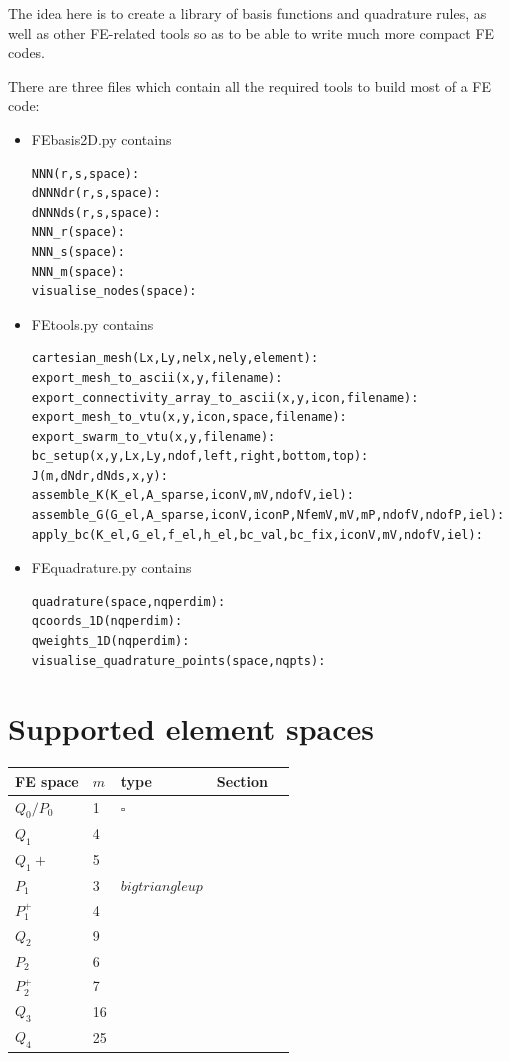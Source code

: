 
The idea here is to create a library of basis functions and quadrature rules, as well as 
other FE-related tools so as to be able to write much more compact FE codes. 

There are three files which contain all the required tools to build most of a FE code:

\begin{itemize}

\item {\pythonfile FEbasis2D.py} contains 
\begin{lstlisting}
NNN(r,s,space):
dNNNdr(r,s,space):
dNNNds(r,s,space):
NNN_r(space):
NNN_s(space):
NNN_m(space):
visualise_nodes(space):
\end{lstlisting}



\item {\pythonfile FEtools.py} contains

\begin{lstlisting}
cartesian_mesh(Lx,Ly,nelx,nely,element):
export_mesh_to_ascii(x,y,filename):
export_connectivity_array_to_ascii(x,y,icon,filename):
export_mesh_to_vtu(x,y,icon,space,filename):
export_swarm_to_vtu(x,y,filename):
bc_setup(x,y,Lx,Ly,ndof,left,right,bottom,top):
J(m,dNdr,dNds,x,y):
assemble_K(K_el,A_sparse,iconV,mV,ndofV,iel):
assemble_G(G_el,A_sparse,iconV,iconP,NfemV,mV,mP,ndofV,ndofP,iel):
apply_bc(K_el,G_el,f_el,h_el,bc_val,bc_fix,iconV,mV,ndofV,iel):
\end{lstlisting}

\item {\pythonfile FEquadrature.py} contains

\begin{lstlisting}
quadrature(space,nqperdim):
qcoords_1D(nqperdim):
qweights_1D(nqperdim):
visualise_quadrature_points(space,nqpts):
\end{lstlisting}

\end{itemize}

\section*{Supported element spaces}

\begin{tabular}{lllll}
\hline
FE space  & $m$ & type  & Section  \\
\hline
\hline
$Q_0/P_0$ & 1   & $\square$ & \\
$Q_1$     & 4   &       & \\
$Q_1+$    & 5   &       & \\
$P_1$     & 3   & $bigtriangleup$ & \\
$P_1^+$   & 4   &   &    \\
$Q_2$     & 9   &   &    \\
$P_2$     & 6   &   &    \\
$P_2^+$   & 7   &   &    \\
$Q_3$     & 16  &   &    \\
$Q_4$     & 25  &   &    \\
\hline
\end{tabular}


